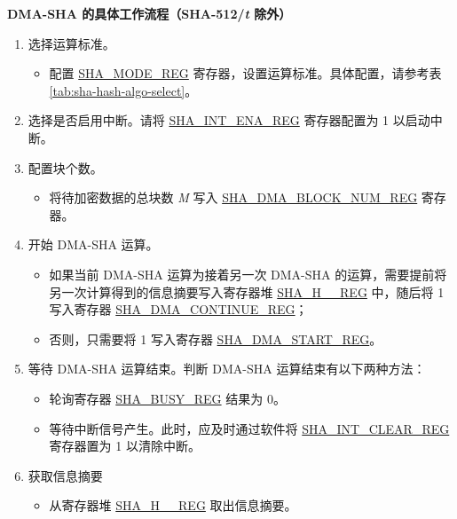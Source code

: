 \textbf{DMA-SHA 的具体工作流程（SHA-512/{\it{t}} 除外）}

\begin{enumerate}
    \item 选择运算标准。
    \begin{itemize}
        \item 配置 \hyperref[regdesc:SHAMODEREG]{SHA\_MODE\_REG} 寄存器，设置运算标准。具体配置，请参考表 \ref{tab:sha-hash-algo-select}。
    \end{itemize}
    \item 选择是否启用中断。请将 \hyperref[regdesc:SHAINTENAREG]{SHA\_INT\_ENA\_REG} 寄存器配置为 1 以启动中断。
    \item 配置块个数。
    \begin{itemize}
        \item  将待加密数据的总块数 {\it{M}} 写入  \hyperref[regdesc:SHADMABLOCKNUMREG]{SHA\_DMA\_BLOCK\_NUM\_REG} 寄存器。
    \end{itemize}
    \item 开始 DMA-SHA 运算。
        \begin{itemize}
            \item 如果当前 DMA-SHA 运算为接着另一次 DMA-SHA 的运算，需要提前将另一次计算得到的信息摘要写入寄存器堆 \hyperref[regdesc:SHAHNREG]{SHA\_H\_\_REG} 中，随后将 1 写入寄存器 \hyperref[regdesc:SHADMACONTINUEREG]{SHA\_DMA\_CONTINUE\_REG}；
            \item 否则，只需要将 1 写入寄存器 \hyperref[regdesc:SHADMASTARTREG]{SHA\_DMA\_START\_REG}。
        \end{itemize}
    \item 等待 DMA-SHA 运算结束。判断 DMA-SHA 运算结束有以下两种方法：
        \begin{itemize}
            \item 轮询寄存器 \hyperref[regdesc:SHABUSYREG]{SHA\_BUSY\_REG} 结果为 0。
            \item 等待中断信号产生。此时，应及时通过软件将 \hyperref[regdesc:SHAINTCLEARREG]{SHA\_INT\_CLEAR\_REG} 寄存器置为 1 以清除中断。
        \end{itemize}
    
    \item 获取信息摘要
    \begin{itemize}
        \item 从寄存器堆 \hyperref[regdesc:SHAHNREG]{SHA\_H\_\_REG} 取出信息摘要。
    \end{itemize}
    
\end{enumerate}